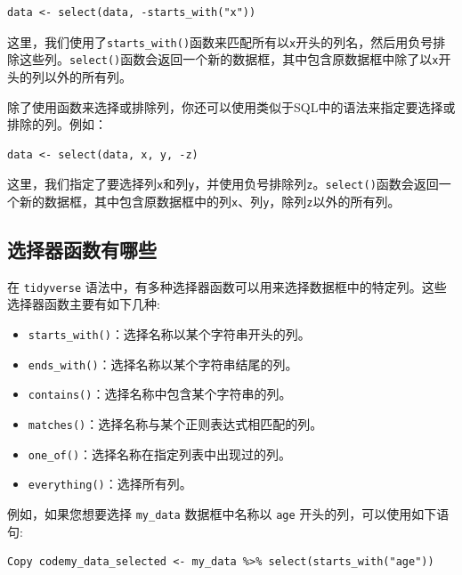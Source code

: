 \documentclass[
  letterpaper,
  DIV=11,
  numbers=noendperiod]{scrreprt}
\providecommand{\tightlist}{%
  \setlength{\itemsep}{0pt}\setlength{\parskip}{0pt}}\usepackage{longtable,booktabs,array}
\begin{document}
\begin{verbatim}
data <- select(data, -starts_with("x"))
\end{verbatim}

这里，我们使用了\texttt{starts\_with()}函数来匹配所有以\texttt{x}开头的列名，然后用负号排除这些列。\texttt{select()}函数会返回一个新的数据框，其中包含原数据框中除了以\texttt{x}开头的列以外的所有列。

除了使用函数来选择或排除列，你还可以使用类似于SQL中的语法来指定要选择或排除的列。例如：

\begin{verbatim}
data <- select(data, x, y, -z)
\end{verbatim}

这里，我们指定了要选择列\texttt{x}和列\texttt{y}，并使用负号排除列\texttt{z}。\texttt{select()}函数会返回一个新的数据框，其中包含原数据框中的列\texttt{x}、列\texttt{y}，除列\texttt{z}以外的所有列。

\hypertarget{ux9009ux62e9ux5668ux51fdux6570ux6709ux54eaux4e9b}{%
\subsection{选择器函数有哪些}\label{ux9009ux62e9ux5668ux51fdux6570ux6709ux54eaux4e9b}}

在 \texttt{tidyverse}
语法中，有多种选择器函数可以用来选择数据框中的特定列。这些选择器函数主要有如下几种:

\begin{itemize}
\tightlist
\item
  \texttt{starts\_with()}：选择名称以某个字符串开头的列。
\item
  \texttt{ends\_with()}：选择名称以某个字符串结尾的列。
\item
  \texttt{contains()}：选择名称中包含某个字符串的列。
\item
  \texttt{matches()}：选择名称与某个正则表达式相匹配的列。
\item
  \texttt{one\_of()}：选择名称在指定列表中出现过的列。
\item
  \texttt{everything()}：选择所有列。
\end{itemize}

例如，如果您想要选择 \texttt{my\_data} 数据框中名称以 \texttt{age}
开头的列，可以使用如下语句:

\begin{verbatim}
Copy codemy_data_selected <- my_data %>% select(starts_with("age"))
\end{verbatim}
\end{document}

